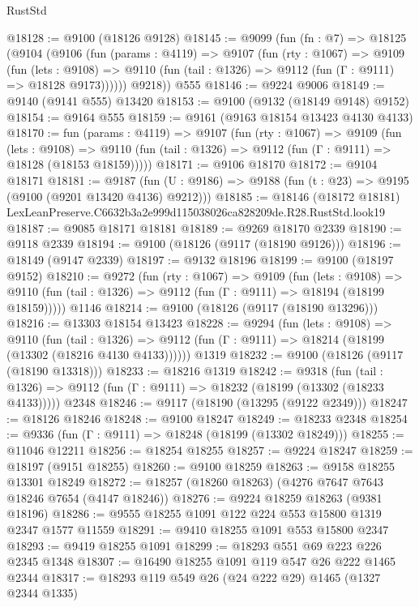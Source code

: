 \begin{lexlean}{RustStd}
\begin{coremodule}
@18128 := @9100 (@18126 @9128)
@18145 := @9099
    (fun (fn : @7) =>
    @18125
      (@9104
        (@9106
          (fun (params : @4119) =>
          @9107
            (fun (rty : @1067) =>
            @9109
              (fun (lets : @9108) =>
              @9110 (fun (tail : @1326) => @9112 (fun (Γ : @9111) => @18128 @9173))))))
        @9218))
    @555
@18146 := @9224 @9006
@18149 := @9140 (@9141 @555) @13420
@18153 := @9100 (@9132 (@18149 @9148) @9152)
@18154 := @9164 @555
@18159 := @9161 (@9163 @18154 @13423 @4130 @4133)
@18170 := fun (params : @4119) =>
  @9107
    (fun (rty : @1067) =>
    @9109
      (fun (lets : @9108) =>
      @9110 (fun (tail : @1326) => @9112 (fun (Γ : @9111) => @18128 (@18153 @18159)))))
@18171 := @9106 @18170
@18172 := @9104 @18171
@18181 := @9187
    (fun (U : @9186) => @9188 (fun (t : @23) => @9195 (@9100 (@9201 @13420 @4136) @9212)))
@18185 := @18146
    (@18172 @18181)
    LexLeanPreserve.C6632b3a2e999d115038026ca828209de.R28.RustStd.look19
@18187 := @9085 @18171 @18181
@18189 := @9269 @18170 @2339
@18190 := @9118 @2339
@18194 := @9100 (@18126 (@9117 (@18190 @9126)))
@18196 := @18149 (@9147 @2339)
@18197 := @9132 @18196
@18199 := @9100 (@18197 @9152)
@18210 := @9272
    (fun (rty : @1067) =>
    @9109
      (fun (lets : @9108) =>
      @9110 (fun (tail : @1326) => @9112 (fun (Γ : @9111) => @18194 (@18199 @18159)))))
    @1146
@18214 := @9100 (@18126 (@9117 (@18190 @13296)))
@18216 := @13303 @18154 @13423
@18228 := @9294
    (fun (lets : @9108) =>
    @9110
      (fun (tail : @1326) =>
      @9112 (fun (Γ : @9111) => @18214 (@18199 (@13302 (@18216 @4130 @4133))))))
    @1319
@18232 := @9100 (@18126 (@9117 (@18190 @13318)))
@18233 := @18216 @1319
@18242 := @9318
    (fun (tail : @1326) => @9112 (fun (Γ : @9111) => @18232 (@18199 (@13302 (@18233 @4133)))))
    @2348
@18246 := @9117 (@18190 (@13295 (@9122 @2349)))
@18247 := @18126 @18246
@18248 := @9100 @18247
@18249 := @18233 @2348
@18254 := @9336 (fun (Γ : @9111) => @18248 (@18199 (@13302 @18249)))
@18255 := @11046 @12211
@18256 := @18254 @18255
@18257 := @9224 @18247
@18259 := @18197 (@9151 @18255)
@18260 := @9100 @18259
@18263 := @9158 @18255 @13301 @18249
@18272 := @18257 (@18260 @18263) (@4276 @7647 @7643 @18246 @7654 (@4147 @18246))
@18276 := @9224 @18259 @18263 (@9381 @18196)
@18286 := @9555 @18255 @1091 @122 @224 @553 @15800 @1319 @2347 @1577 @11559
@18291 := @9410 @18255 @1091 @553 @15800 @2347
@18293 := @9419 @18255 @1091
@18299 := @18293 @551 @69 @223 @226 @2345 @1348
@18307 := @16490 @18255 @1091 @119 @547 @26 @222 @1465 @2344
@18317 := @18293 @119 @549 @26 (@24 @222 @29) @1465 (@1327 @2344 @1335)

\end{coremodule}
\end{lexlean}
